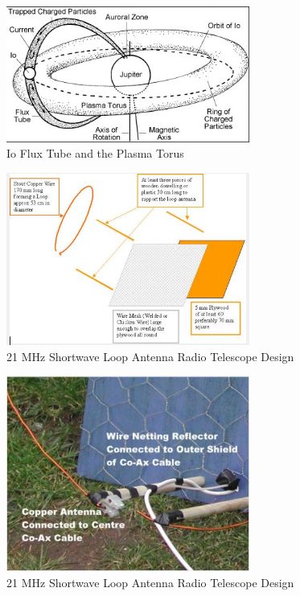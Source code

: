 \documentclass[runningheads,a4paper]{llncs}
\begin{document}
%
\begin{figure}[here]
\centering
\includegraphics[width=8cm]{images/13}
\caption{Io Flux Tube and the Plasma Torus \citep{lang-10}}
\label{fig:io_flux_tube_plasma_torus}
\end{figure}
%

%
\begin{figure}[here]
\centering
\includegraphics[width=8cm]{images/14}
\caption{21 MHz Shortwave Loop Antenna Radio Telescope Design \citep{greef-12}}
\label{fig:loop_antenna_design_a}
\end{figure}
%

%
\begin{figure}[here]
\centering
\includegraphics[width=8cm]{images/16}
\caption{21 MHz Shortwave Loop Antenna Radio Telescope Design \citep{greef-12}}
\label{fig:loop_antenna_design_b}
\end{figure}
%
\end{document}
